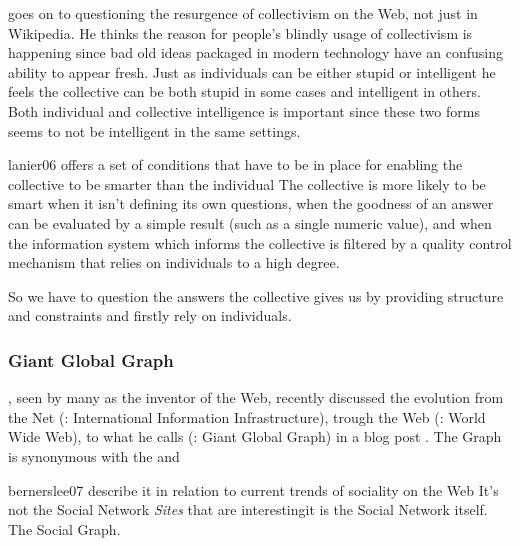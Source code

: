 \citet{lanier06} goes on to questioning the resurgence of collectivism on the
Web, not just in Wikipedia.
He thinks the reason for people's blindly usage of collectivism is happening
since bad old ideas packaged in modern technology have an confusing ability to
appear fresh. Just as individuals can be either
stupid or intelligent he feels the collective can be both stupid in some cases
and intelligent in others. Both individual and collective intelligence is
important since these two forms seems to not be intelligent in the same
settings.

\begin{fullquote}{lanier06}{%
  offers a set of conditions that have to be in place for enabling the
  collective to be smarter than the individual}
    The collective is more likely to be smart when it isn't defining its own
    questions, when the goodness of an answer can be evaluated by a simple
    result (such as a single numeric value), and when the information system
    which informs the collective is filtered by a quality control mechanism
    that relies on individuals to a high degree.
\end{fullquote}

So we have to question the answers the collective gives us by providing
structure and constraints and firstly rely on individuals.

\subsubsection{Giant Global Graph}
\citeauthor{bernerslee07}, seen by many as the inventor of the Web,
recently discussed the evolution from the Net (: International
Information Infrastructure), trough the Web (: World Wide Web),
to what he calls  (: Giant Global Graph) in a
blog post \citeyearpar{bernerslee07}. The Graph is synonymous with the
%
and
\begin{fullquote}{bernerslee07}{%
  describe it in relation to current trends of sociality on the Web}
    It's not the Social Network \emph{Sites} that are interesting\dash{}it is
    the Social Network itself. The Social Graph.
\end{fullquote}

